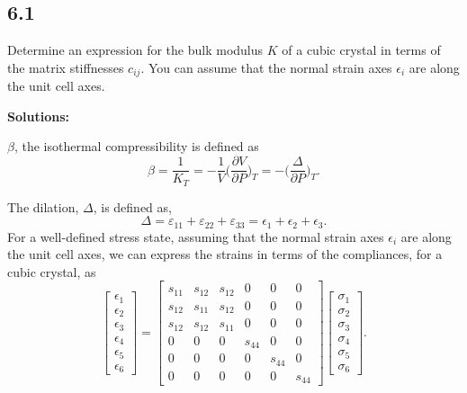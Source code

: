 \documentclass[12pt]{article}
\begin{document}
\subsection{6.1}
Determine an expression for the bulk modulus $K$ of a cubic crystal in terms of the matrix stiffnesses $c_{ij}$.
You can assume that the normal strain axes $\epsilon_i$ are along the unit cell axes.

\textbf{Solutions:}

$\beta$, the isothermal compressibility is defined as
\begin{equation}
	\beta = \frac{ 1 }{ K_T } = -\frac{ 1 }{ V }\Big( \frac{ \partial V }{ \partial P } \Big)_T
	= -\Big( \frac{ \Delta }{ \partial P } \Big)_T.
\end{equation}

The dilation, $\Delta$, is defined as,
\begin{equation}
	\Delta = \varepsilon_{11} + \varepsilon_{22} + \varepsilon_{33} = \epsilon_1 + \epsilon_2 + \epsilon_3.
\end{equation}
For a well-defined stress state, assuming that the normal strain axes $\epsilon_i$ are along the unit cell axes, we can express the strains
in terms of the compliances, for a cubic crystal, as
\begin{equation}
	\begin{bmatrix}
		\epsilon_1 \\
		\epsilon_2 \\
		\epsilon_3 \\
		\epsilon_4 \\
		\epsilon_5 \\
		\epsilon_6
	\end{bmatrix}
	=
	\begin{bmatrix}
		s_{11} & s_{12} & s_{12} & 0      & 0      & 0      \\
		s_{12} & s_{11} & s_{12} & 0      & 0      & 0      \\
		s_{12} & s_{12} & s_{11} & 0      & 0      & 0      \\
		0      & 0      & 0      & s_{44} & 0      & 0      \\
		0      & 0      & 0      & 0      & s_{44} & 0      \\
		0      & 0      & 0      & 0      & 0      & s_{44}
	\end{bmatrix}
	\begin{bmatrix}
		\sigma_1 \\
		\sigma_2 \\
		\sigma_3 \\
		\sigma_4 \\
		\sigma_5 \\
		\sigma_6
	\end{bmatrix}.
\end{equation}
\end{document}
